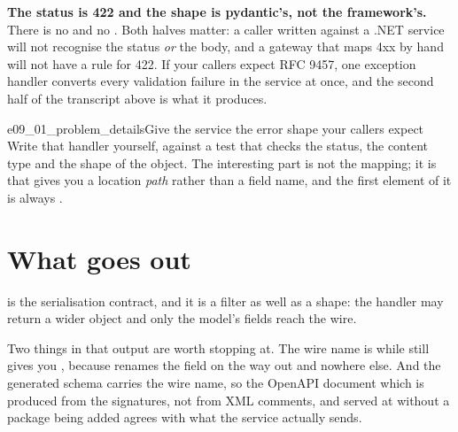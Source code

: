 
\begin{trapbox}
\textbf{The status is 422 and the shape is pydantic's, not the framework's.}
There is no  and no
. Both halves matter: a caller written
against a .NET service will not recognise the status \emph{or} the body, and
a gateway that maps 4xx by hand will not have a rule for 422. If your callers
expect RFC 9457, one exception handler converts every validation failure in
the service at once, and the second half of the transcript above is what it
produces.
\end{trapbox}


\begin{exercise}{e09_01_problem_details}{Give the service the error shape your callers expect}
Write that handler yourself, against a test that checks the status, the
content type and the shape of the  object. The interesting part
is not the mapping; it is that  gives you a location
\emph{path} rather than a field name, and the first element of it is always
.
\end{exercise}

\section{What goes out}
\label{sec:ch09-serialisation}

 is the serialisation contract, and it is a filter as
well as a shape: the handler may return a wider object and only the model's
fields reach the wire.




\noindent
Two things in that output are worth stopping at. The wire name is
 while  still gives you
, because  renames the field
on the way out and nowhere else. And the generated schema carries the wire
name, so the OpenAPI document \dash{} which is produced from the signatures,
not from XML comments, and served at  without a package
being added \dash{} agrees with what the service actually sends.

